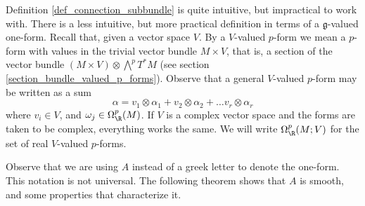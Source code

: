Definition \ref{def_connection_subbundle} is quite intuitive, but impractical to work with. There is a less intuitive, but more practical definition in terms of a \(\mathfrak{g}\)-valued one-form. Recall that, given a vector space \(V\). By a \(V\)-valued \(p\)-form we mean a \(p\)-form with values in the trivial vector bundle \(M \times V\), that is, a section of the vector bundle \((M \times V) \otimes \bigwedge^pT^*M\) (see section \ref{section_bundle_valued_p_forms}). Observe that a general \(V\)-valued \(p\)-form may be written as a sum 
\begin{equation} \label{V_valued_pform}
\alpha=v_1 \otimes \alpha_1+v_2\otimes \alpha_2 + \ldots v_r\otimes \alpha_r
\end{equation}
where \(v_i \in V\), and \(\omega_j \in \Omega^p_\R(M)\). If \(V\) is a complex vector space and the forms are taken to be complex, everything works the same. We will write \(\Omega^p_\R(M;V)\) for the set of real \(V\)-valued \(p\)-forms.

Observe that we are using \(A\) instead of a greek letter to denote the one-form. This notation is not universal. The following theorem shows that \(A\) is smooth, and some properties that characterize it.

